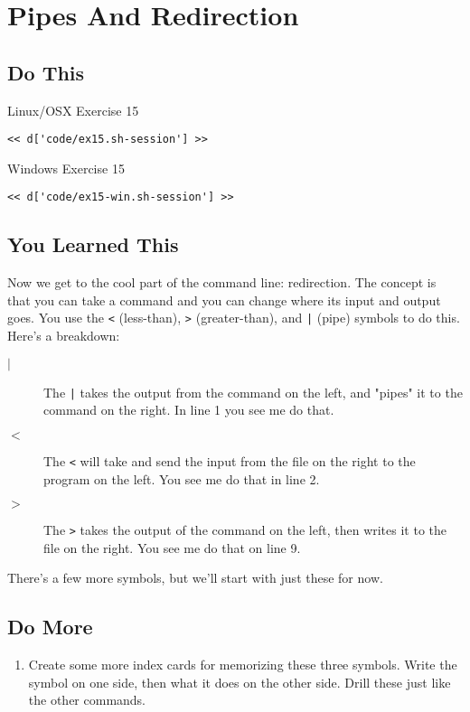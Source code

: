 \chapter{Pipes And Redirection}

\section{Do This}

\begin{code}{Linux/OSX Exercise 15}
\begin{Verbatim}
<< d['code/ex15.sh-session'] >>
\end{Verbatim}
\end{code}

\begin{code}{Windows Exercise 15}
\begin{Verbatim}
<< d['code/ex15-win.sh-session'] >>
\end{Verbatim}
\end{code}

\section{You Learned This}

Now we get to the cool part of the command line: redirection.  The concept is
that you can take a command and you can change where its input and output goes. 
You use the \verb|<| (less-than), \verb|>| (greater-than), and \verb,|, (pipe) 
symbols to do this.  Here's a breakdown:

\begin{description}
\item[$|$] The \verb,|, takes the output from the command on the left, and "pipes" it to the command on the right.  In line 1 you see me do that.
\item[$<$] The \verb|<| will take and send the input from the file on the right to the program on the left.  You see me do that in line 2.
\item[$>$] The \verb|>| takes the output of the command on the left, then writes it
    to the file on the right.  You see me do that on line 9.
\end{description}

There's a few more symbols, but we'll start with just these for now.

\section{Do More}

\begin{enumerate}
\item Create some more index cards for memorizing these three symbols.  Write the symbol on one side, then what it does on the other side.  Drill these just like the other commands.
\end{enumerate}

